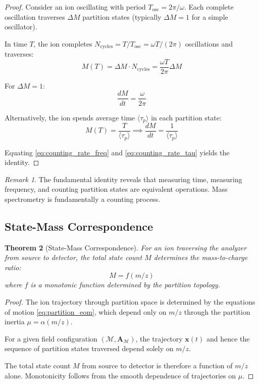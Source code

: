 \documentclass[twocolumn,10pt,a4paper]{article}
\newtheorem{theorem}{Theorem}[section]
\theoremstyle{definition}
\theoremstyle{remark}
\newtheorem{remark}[theorem]{Remark}
\newcommand{\Mdepth}{\mathcal{M}}
\newcommand{\Apartition}{\mathbf{A}_{\mathcal{M}}}
\newcommand{\partinert}{\mu}
\newcommand{\taup}{\tau_p}
\begin{document}
\begin{proof}
Consider an ion oscillating with period $T_{\mathrm{osc}} = 2\pi/\omega$. Each complete oscillation traverses $\Delta M$ partition states (typically $\Delta M = 1$ for a simple oscillator).

In time $T$, the ion completes $N_{\mathrm{cycles}} = T/T_{\mathrm{osc}} = \omega T/(2\pi)$ oscillations and traverses:
\begin{equation}
    M(T) = \Delta M \cdot N_{\mathrm{cycles}} = \frac{\omega T}{2\pi}\Delta M
\end{equation}

For $\Delta M = 1$:
\begin{equation}
    \frac{dM}{dt} = \frac{\omega}{2\pi}
    \label{eq:counting_rate_freq}
\end{equation}

Alternatively, the ion spends average time $\langle\taup\rangle$ in each partition state:
\begin{equation}
    M(T) = \frac{T}{\langle\taup\rangle} \implies \frac{dM}{dt} = \frac{1}{\langle\taup\rangle}
    \label{eq:counting_rate_tau}
\end{equation}

Equating \eqref{eq:counting_rate_freq} and \eqref{eq:counting_rate_tau} yields the identity.
\end{proof}

\begin{remark}
The fundamental identity reveals that measuring time, measuring frequency, and counting partition states are equivalent operations. Mass spectrometry is fundamentally a counting process.
\end{remark}

\subsection{State-Mass Correspondence}

\begin{theorem}[State-Mass Correspondence]
\label{thm:state_mass}
For an ion traversing the analyzer from source to detector, the total state count $M$ determines the mass-to-charge ratio:
\begin{equation}
    M = f(m/z)
    \label{eq:state_mass}
\end{equation}
where $f$ is a monotonic function determined by the partition topology.
\end{theorem}

\begin{proof}
The ion trajectory through partition space is determined by the equations of motion \eqref{eq:partition_eom}, which depend only on $m/z$ through the partition inertia $\partinert = \alpha(m/z)$.

For a given field configuration $(\Mdepth, \Apartition)$, the trajectory $\mathbf{x}(t)$ and hence the sequence of partition states traversed depend solely on $m/z$.

The total state count $M$ from source to detector is therefore a function of $m/z$ alone. Monotonicity follows from the smooth dependence of trajectories on $\partinert$.
\end{proof}
\end{document}
